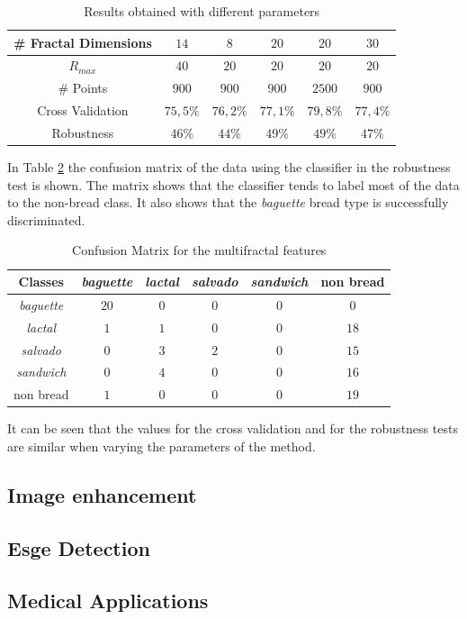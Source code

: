 \documentclass[oneside,a4paper,english,links]{article}
\begin{document}
\begin{table}[htb]
\centering
\begin{tabular}{|c|c|c|c|c|c|}
    \hline
    \# Fractal Dimensions & $14$ & $8$ & $20$ & $20$ & $30$\\
    \hline
    $R_{max}$ & $40$ & $20$ & $20$ & $20$ & $20$\\
    \hline
    \# Points & $900$ & $900$ & $900$ & $2500$ & $900$\\
    \hline
    Cross Validation  & $75,5\%$ & $76,2\%$ & $77,1\%$ & $79,8\%$ & $77,4\%$\\
    \hline
    Robustness & $46\%$ & $44\%$ & $49\%$ & $49\%$ & $47\%$ \\
    \hline
\end{tabular}
\caption{Results obtained with different parameters}
\label{table:tableFirstTest}
\end{table}


In Table \ref{table:ConfusionMatrixFractal} the confusion matrix of the data using the classifier in the robustness test is shown. The matrix shows that the classifier tends to label most of the data to the non-bread class. It also shows that the {\em baguette} bread type is successfully discriminated.
\begin{table}[htb]
\centering
\begin{tabular}{|c|c|c|c|c|c|}
    \hline
    Classes & {\em baguette} & {\em lactal} & {\em salvado} & {\em sandwich} & non bread\\
    \hline
    \hline
    {\em baguette}  & $20$ & $0$ & $0$ & $0$  & $0$\\
    \hline
    {\em lactal}    & $1$ & $1$ & $0$ & $0$  & $18$\\
    \hline
    {\em salvado}   & $0$ & $3$ & $2$ & $0$  & $15$\\
    \hline
    {\em sandwich}  & $0$ & $4$  & $0$ & $0$ & $16$\\
    \hline
    non bread       & $1$ & $0$  & $0$ & $0$  & $19$\\
    \hline
\end{tabular}
\caption{Confusion Matrix for the multifractal features}
\label{table:ConfusionMatrixFractal}
\end{table}

It can be seen that the values for the cross validation and for the robustness tests are similar when varying the parameters of the method.

\subsection{Image enhancement}
\subsection{Esge Detection}
\subsection{Medical Applications}






\end{document}
